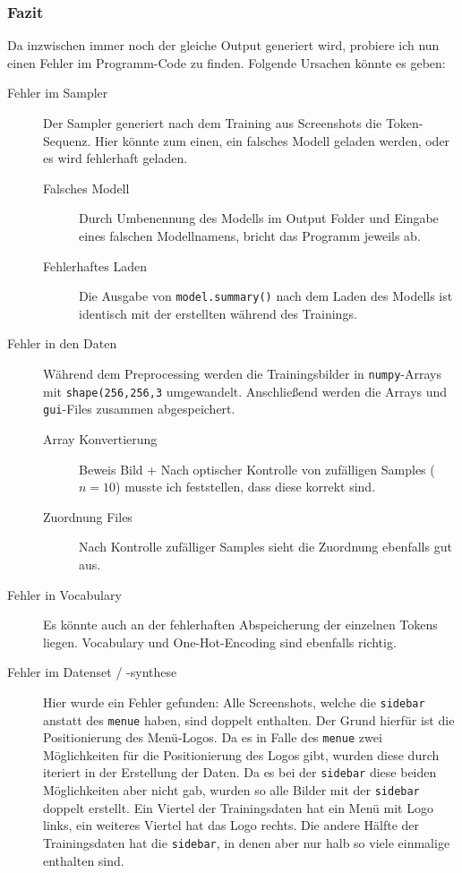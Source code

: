 \documentclass[pdftex,a4paper,halfparskip, article]{scrartcl}
\begin{document}
\subsubsection*{Fazit}

Da inzwischen immer noch der gleiche Output generiert wird, probiere ich nun einen Fehler im Programm-Code zu finden. Folgende Ursachen könnte es geben:

\begin{description}
	\item[Fehler im Sampler] Der Sampler generiert nach dem Training aus Screenshots die Token-Sequenz. Hier könnte zum einen, ein falsches Modell geladen werden, oder es wird fehlerhaft geladen.
	
	\begin{description}
		\item[Falsches Modell] Durch Umbenennung des Modells im Output Folder und Eingabe eines falschen Modellnamens, bricht das Programm jeweils ab.
		\item[Fehlerhaftes Laden] Die Ausgabe von \texttt{model.summary()} nach dem Laden des Modells ist identisch mit der erstellten während des Trainings.
	\end{description}
	
	\item[Fehler in den Daten] Während dem Preprocessing werden die Trainingsbilder in \texttt{numpy}-Arrays mit \texttt{shape(256,256,3} umgewandelt. Anschließend werden die Arrays und \texttt{gui}-Files zusammen abgespeichert.
	
	\begin{description}
		\item[Array Konvertierung] Beweis Bild + Nach optischer Kontrolle von zufälligen Samples ($n=10$) musste ich feststellen, dass diese korrekt sind.
		\item[Zuordnung Files] Nach Kontrolle zufälliger Samples sieht die Zuordnung ebenfalls gut aus.
	\end{description}
	
	\item[Fehler in Vocabulary] Es könnte auch an der fehlerhaften Abspeicherung der einzelnen Tokens liegen. Vocabulary und One-Hot-Encoding sind ebenfalls richtig.
	
	\item[Fehler im Datenset / -synthese] Hier wurde ein Fehler gefunden: Alle Screenshots, welche die \texttt{sidebar} anstatt des \texttt{menue} haben, sind doppelt enthalten. Der Grund hierfür ist die Positionierung des Menü-Logos. Da es in Falle des \texttt{menue} zwei Möglichkeiten für die Positionierung des Logos gibt, wurden diese durch iteriert in der Erstellung der Daten. Da es bei der \texttt{sidebar} diese beiden Möglichkeiten aber nicht gab, wurden so alle Bilder mit der \texttt{sidebar} doppelt erstellt. Ein Viertel der Trainingsdaten hat ein Menü mit Logo links, ein weiteres Viertel hat das Logo rechts. Die andere Hälfte der Trainingsdaten hat die \texttt{sidebar}, in denen aber nur halb so viele einmalige enthalten sind.
	
\end{description}
\end{document}
